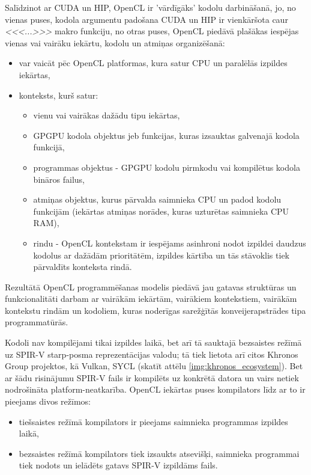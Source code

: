 Salīdzinot ar CUDA un HIP, OpenCL ir 'vārdīgāks' kodolu darbināšanā, jo, no
vienas puses, kodola argumentu padošana CUDA un HIP ir vienkāršota caur
\textit{<<<...>>>} makro funkciju, no otras puses, OpenCL piedāvā plašākas
iespējas vienas vai vairāku iekārtu, kodolu un atmiņas organizēšanā: \cite{opencl-spec}
\begin{itemize}
    \item var vaicāt pēc OpenCL platformas, kura satur CPU un paralēlās izpildes
        iekārtas,
    \item konteksts, kurš satur:
    \begin{itemize}
        \item vienu vai vairākas dažādu tipu iekārtas,
        \item GPGPU kodola objektus jeb funkcijas, kuras izsauktas galvenajā
            kodola funkcijā,
        \item programmas objektus - GPGPU kodolu pirmkodu vai kompilētus kodola
            bināros failus,
        \item atmiņas objektus, kurus pārvalda saimnieka CPU un padod kodolu
            funkcijām (iekārtas atmiņas norādes, kuras uzturētas saimnieka CPU
            RAM),
        \item rindu - OpenCL kontekstam ir iespējams asinhroni nodot izpildei
            daudzus kodolus ar dažādām prioritātēm, izpildes kārtība un tās stāvoklis
            tiek pārvaldīts konteksta rindā.
    \end{itemize}
\end{itemize}

Rezultātā OpenCL programmēšanas modelis piedāvā jau gatavas struktūras un
funkcionalitāti darbam ar vairākām iekārtām, vairākiem kontekstiem, vairākām
kontekstu rindām un kodoliem, kuras noderīgas sarežģītās konveijerapstrādes
tipa programmatūrās.

Kodoli nav kompilējami tikai izpildes laikā, bet arī tā sauktajā bezsaistes
režīmā uz SPIR-V starp-posma reprezentācijas valodu; tā tiek lietota arī citos
Khronos Group projektos, kā Vulkan, SYCL\cite{spirv-spec} (skatīt attēlu
\ref{img:khronos_ecosystem}). Bet ar šādu risinājumu SPIR-V fails ir kompilēts
uz konkrētā datora un vairs netiek nodrošināta platform-neatkarība.
OpenCL iekārtas puses kompilators līdz ar to ir pieejams divos režīmos:
\begin{itemize}
    \item tiešsaistes režīmā kompilators ir pieejams saimnieka programmas izpildes
        laikā,
        \item bezsaistes režīmā kompilators tiek izsaukts atsevišķi, saimnieka programmai tiek
        nodots un ielādēts gatavs SPIR-V izpildāms fails.
\end{itemize}

